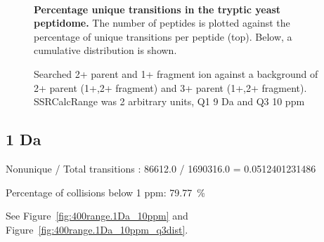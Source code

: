 \begin{figure}

\center
{} \\

\caption{ \textbf{Percentage unique transitions in the tryptic yeast peptidome.}
The number of peptides is plotted against the percentage of unique transitions
per peptide (top). Below, a cumulative distribution is shown.
}
\label{fig:400range.9Da_10ppm}
\end{figure}
\begin{figure}

\center
{}

\caption{
Searched 2+ parent and 1+ fragment ion against a background of 2+ parent (1+,2+ fragment) and 3+ parent (1+,2+ fragment).
SSRCalcRange was 2 arbitrary units, Q1 9 Da and Q3 10 ppm
}
\label{fig:400range.9Da_10ppm_q3dist}
\end{figure}


\subsection{1 Da}

Nonunique / Total transitions : 86612.0 / 1690316.0 = 0.0512401231486

Percentage of collisions below 1 ppm: 79.77~\%


See Figure~\ref{fig:400range.1Da_10ppm} and Figure~\ref{fig:400range.1Da_10ppm_q3dist}.

